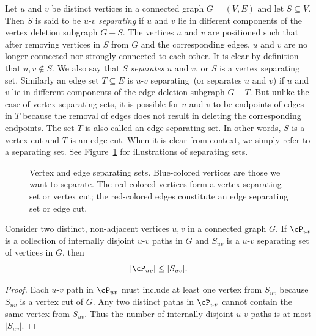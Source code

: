 Let $u$ and $v$ be distinct vertices in a connected graph $G = (V,E)$
and let $S \subseteq V$. Then $S$ is said to be $u$-$v$
\emph{separating} if $u$ and $v$ lie in different components of the
vertex deletion subgraph $G - S$. The vertices $u$ and $v$ are
positioned such that after removing vertices in $S$ from $G$ and the
corresponding edges, $u$ and $v$ are no longer connected nor strongly
connected to each other. It is clear by definition that
$u,v \notin S$. We also say that $S$ \emph{separates} $u$ and
$v$, or $S$ is a vertex separating set. Similarly an edge set
$T \subseteq E$ is $u$-$v$ separating~(or separates $u$ and $v$) if
$u$ and $v$ lie in different components of the edge deletion subgraph
$G - T$. But unlike the case of vertex separating sets, it is possible
for $u$ and $v$ to be endpoints of edges in $T$ because the removal of
edges does not result in deleting the corresponding endpoints. The set
$T$ is also called an edge separating set. In other words, $S$ is a
vertex cut and $T$ is an edge
cut. When it is clear from context, we simply refer to
a separating set. See
Figure~\ref{fig:distance_connectivity:vertex_edge_separating_sets} for
illustrations of separating sets.

\begin{figure}[!htbp]
\centering
{}

\caption{Vertex and edge separating sets. Blue-colored vertices are
  those we want to separate. The red-colored vertices form a vertex
  separating set or vertex cut; the red-colored
  edges constitute an edge separating set or edge cut.}
\label{fig:distance_connectivity:vertex_edge_separating_sets}
\end{figure}

\begin{proposition}
\label{prop:distance_connectivity:upper_bound_internally_disjoint_paths}
Consider two distinct, non-adjacent vertices $u,v$ in a connected
graph $G$. If $\cP_{uv}$ is a collection of internally disjoint
$u$-$v$ paths in $G$ and $S_{uv}$ is a $u$-$v$ separating set of
vertices in $G$, then
\begin{equation}
\label{eqn:distance_connectivity:upper_bound_internally_disjoint_paths}
|\cP_{uv}| \leq |S_{uv}|.
\end{equation}
\end{proposition}

\begin{proof}
Each $u$-$v$ path in $\cP_{uv}$ must include at least one vertex from
$S_{uv}$ because $S_{uv}$ is a vertex cut of $G$. Any two distinct
paths in $\cP_{uv}$ cannot contain the same vertex from $S_{uv}$. Thus
the number of internally disjoint $u$-$v$ paths is at most $|S_{uv}|$.
\end{proof}

